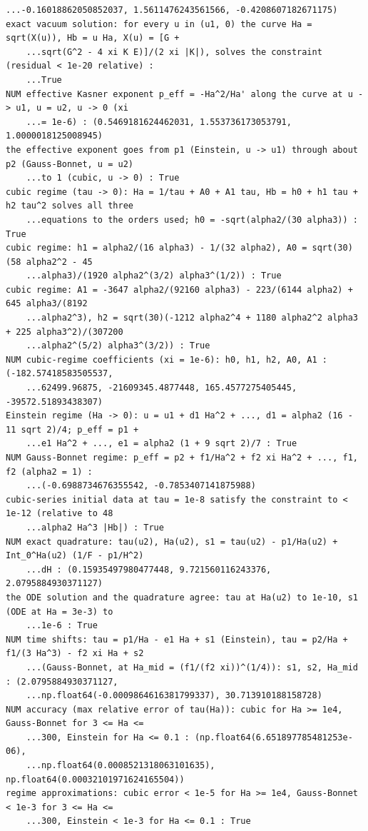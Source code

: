 \documentclass[10pt,a4paper]{article}
\begin{document}
\begin{Verbatim}[fontsize=\small,frame=single,framesep=2mm]
    ...-0.16018862050852037, 1.5611476243561566, -0.4208607182671175)
exact vacuum solution: for every u in (u1, 0) the curve Ha = sqrt(X(u)), Hb = u Ha, X(u) = [G +
    ...sqrt(G^2 - 4 xi K E)]/(2 xi |K|), solves the constraint (residual < 1e-20 relative) :
    ...True
NUM effective Kasner exponent p_eff = -Ha^2/Ha' along the curve at u -> u1, u = u2, u -> 0 (xi
    ...= 1e-6) : (0.5469181624462031, 1.553736173053791, 1.0000018125008945)
the effective exponent goes from p1 (Einstein, u -> u1) through about p2 (Gauss-Bonnet, u = u2)
    ...to 1 (cubic, u -> 0) : True
cubic regime (tau -> 0): Ha = 1/tau + A0 + A1 tau, Hb = h0 + h1 tau + h2 tau^2 solves all three
    ...equations to the orders used; h0 = -sqrt(alpha2/(30 alpha3)) : True
cubic regime: h1 = alpha2/(16 alpha3) - 1/(32 alpha2), A0 = sqrt(30)(58 alpha2^2 - 45
    ...alpha3)/(1920 alpha2^(3/2) alpha3^(1/2)) : True
cubic regime: A1 = -3647 alpha2/(92160 alpha3) - 223/(6144 alpha2) + 645 alpha3/(8192
    ...alpha2^3), h2 = sqrt(30)(-1212 alpha2^4 + 1180 alpha2^2 alpha3 + 225 alpha3^2)/(307200
    ...alpha2^(5/2) alpha3^(3/2)) : True
NUM cubic-regime coefficients (xi = 1e-6): h0, h1, h2, A0, A1 : (-182.57418583505537,
    ...62499.96875, -21609345.4877448, 165.4577275405445, -39572.51893438307)
Einstein regime (Ha -> 0): u = u1 + d1 Ha^2 + ..., d1 = alpha2 (16 - 11 sqrt 2)/4; p_eff = p1 +
    ...e1 Ha^2 + ..., e1 = alpha2 (1 + 9 sqrt 2)/7 : True
NUM Gauss-Bonnet regime: p_eff = p2 + f1/Ha^2 + f2 xi Ha^2 + ..., f1, f2 (alpha2 = 1) :
    ...(-0.6988734676355542, -0.7853407141875988)
cubic-series initial data at tau = 1e-8 satisfy the constraint to < 1e-12 (relative to 48
    ...alpha2 Ha^3 |Hb|) : True
NUM exact quadrature: tau(u2), Ha(u2), s1 = tau(u2) - p1/Ha(u2) + Int_0^Ha(u2) (1/F - p1/H^2)
    ...dH : (0.15935497980477448, 9.721560116243376, 2.0795884930371127)
the ODE solution and the quadrature agree: tau at Ha(u2) to 1e-10, s1 (ODE at Ha = 3e-3) to
    ...1e-6 : True
NUM time shifts: tau = p1/Ha - e1 Ha + s1 (Einstein), tau = p2/Ha + f1/(3 Ha^3) - f2 xi Ha + s2
    ...(Gauss-Bonnet, at Ha_mid = (f1/(f2 xi))^(1/4)): s1, s2, Ha_mid : (2.0795884930371127,
    ...np.float64(-0.0009864616381799337), 30.713910188158728)
NUM accuracy (max relative error of tau(Ha)): cubic for Ha >= 1e4, Gauss-Bonnet for 3 <= Ha <=
    ...300, Einstein for Ha <= 0.1 : (np.float64(6.651897785481253e-06),
    ...np.float64(0.0008521318063101635), np.float64(0.00032101971624165504))
regime approximations: cubic error < 1e-5 for Ha >= 1e4, Gauss-Bonnet < 1e-3 for 3 <= Ha <=
    ...300, Einstein < 1e-3 for Ha <= 0.1 : True

\end{Verbatim}
\end{document}
